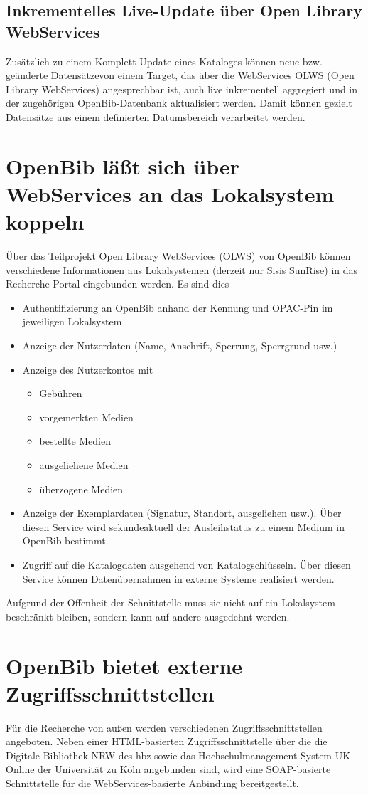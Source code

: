 \documentclass[11pt, twoside, a4paper, BCOR8mm, DIV12, bibtotoc,idxtotoc]{scrbook}
\begin{document}
\subsection{Inkrementelles Live-Update über Open Library WebServices}
Zusätzlich zu einem Komplett-Update eines Kataloges können neue
bzw. geänderte Datensätzevon einem Target, das über die WebServices
OLWS (Open Library WebServices) angesprechbar ist, auch live
inkrementell aggregiert und in der zugehörigen OpenBib-Datenbank
aktualisiert werden. Damit können gezielt Datensätze aus einem
definierten Datumsbereich verarbeitet werden.

\section{OpenBib läßt sich über WebServices an das Lokalsystem koppeln}
Über das Teilprojekt Open Library WebServices (OLWS) von OpenBib
können verschiedene Informationen aus Lokalsystemen (derzeit nur
Sisis SunRise) in das Recherche-Portal eingebunden werden. Es sind
dies
\begin{itemize}
\item Authentifizierung an OpenBib anhand der Kennung und OPAC-Pin im
  jeweiligen Lokalsystem
\item Anzeige der Nutzerdaten (Name, Anschrift, Sperrung, Sperrgrund usw.)
\item Anzeige des Nutzerkontos mit
  \begin{itemize}
  \item Gebühren
  \item vorgemerkten Medien
  \item bestellte Medien
  \item ausgeliehene Medien
  \item überzogene Medien
  \end{itemize}
\item Anzeige der Exemplardaten (Signatur, Standort, ausgeliehen
  usw.). Über diesen Service wird sekundeaktuell der Ausleihstatus zu
  einem Medium in OpenBib bestimmt.
\item Zugriff auf die Katalogdaten ausgehend von
  Katalogschlüsseln. Über diesen Service können Datenübernahmen in
  externe Systeme realisiert werden.
\end{itemize}

Aufgrund der Offenheit der Schnittstelle muss sie nicht auf ein
Lokalsystem beschränkt bleiben, sondern kann auf andere ausgedehnt
werden.
\section{OpenBib bietet externe Zugriffsschnittstellen}
Für die Recherche von außen werden verschiedenen
Zugriffsschnittstellen angeboten. Neben einer HTML-basierten
Zugriffsschnittstelle über die die Digitale Bibliothek NRW des hbz
sowie das Hochschulmanagement-System UK-Online der Universität zu
Köln angebunden sind, wird eine SOAP-basierte Schnittstelle für die
WebServices-basierte Anbindung bereitgestellt.
\end{document}
